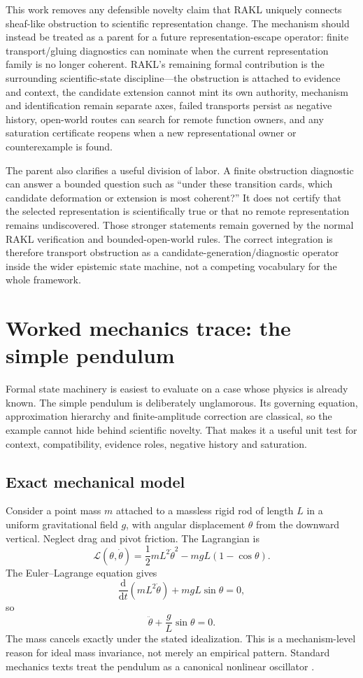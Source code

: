 \documentclass[11pt]{article}
\begin{document}
This work removes any defensible novelty claim that RAKL uniquely connects sheaf-like obstruction to scientific representation change. The mechanism should instead be treated as a parent for a future representation-escape operator: finite transport/gluing diagnostics can nominate when the current representation family is no longer coherent. RAKL's remaining formal contribution is the surrounding scientific-state discipline---the obstruction is attached to evidence and context, the candidate extension cannot mint its own authority, mechanism and identification remain separate axes, failed transports persist as negative history, open-world routes can search for remote function owners, and any saturation certificate reopens when a new representational owner or counterexample is found.

The parent also clarifies a useful division of labor. A finite obstruction diagnostic can answer a bounded question such as ``under these transition cards, which candidate deformation or extension is most coherent?'' It does not certify that the selected representation is scientifically true or that no remote representation remains undiscovered. Those stronger statements remain governed by the normal RAKL verification and bounded-open-world rules. The correct integration is therefore transport obstruction as a candidate-generation/diagnostic operator inside the wider epistemic state machine, not a competing vocabulary for the whole framework.

\section{Worked mechanics trace: the simple pendulum}

Formal state machinery is easiest to evaluate on a case whose physics is already known. The simple pendulum is deliberately unglamorous. Its governing equation, approximation hierarchy and finite-amplitude correction are classical, so the example cannot hide behind scientific novelty. That makes it a useful unit test for context, compatibility, evidence roles, negative history and saturation.

\subsection{Exact mechanical model}

Consider a point mass \(m\) attached to a massless rigid rod of length \(L\) in a uniform gravitational field \(g\), with angular displacement \(\theta\) from the downward vertical. Neglect drag and pivot friction. The Lagrangian is
\[
\mathcal L(\theta,\dot\theta)
=\frac12 mL^2\dot\theta^2-mgL(1-\cos\theta).
\]
The Euler--Lagrange equation gives
\[
\frac{\mathrm d}{\mathrm dt}\left(mL^2\dot\theta\right)
+mgL\sin\theta=0,
\]
so
\[
\boxed{\ddot\theta+\frac{g}{L}\sin\theta=0.}
\]
The mass cancels exactly under the stated idealization. This is a mechanism-level reason for ideal mass invariance, not merely an empirical pattern. Standard mechanics texts treat the pendulum as a canonical nonlinear oscillator \cite{landau1976,strogatz2015}.
\end{document}
